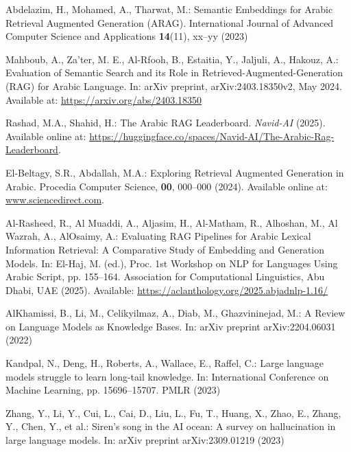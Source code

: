 \documentclass[runningheads]{llncs}
\begin{document}
%
%
%
% 
% 
%
\newpage
\begin{thebibliography}{8}
Abdelazim, H., Mohamed, A., Tharwat, M.: Semantic Embeddings for Arabic Retrieval Augmented Generation (ARAG). International Journal of Advanced Computer Science and Applications \textbf{14}(11), xx--yy (2023)


Mahboub, A., Za’ter, M. E., Al-Rfooh, B., Estaitia, Y., Jaljuli, A., Hakouz, A.:  
Evaluation of Semantic Search and its Role in Retrieved-Augmented-Generation (RAG) for Arabic Language.  
In: arXiv preprint, arXiv:2403.18350v2, May 2024. Available at: \url{https://arxiv.org/abs/2403.18350}

Rashad, M.A., Shahid, H.: The Arabic RAG Leaderboard. \textit{Navid-AI} (2025). Available online at: \url{https://huggingface.co/spaces/Navid-AI/The-Arabic-Rag-Leaderboard}.


El-Beltagy, S.R., Abdallah, M.A.: Exploring Retrieval Augmented Generation in Arabic. Procedia Computer Science, \textbf{00}, 000--000 (2024). Available online at: \url{www.sciencedirect.com}.

Al-Rasheed, R., Al Muaddi, A., Aljasim, H., Al-Matham, R., Alhoshan, M., Al Wazrah, A., AlOsaimy, A.:  
Evaluating RAG Pipelines for Arabic Lexical Information Retrieval: A Comparative Study of Embedding and Generation Models.  
In: El-Haj, M. (ed.), Proc. 1st Workshop on NLP for Languages Using Arabic Script, pp. 155--164.  
Association for Computational Linguistics, Abu Dhabi, UAE (2025).  
Available: \url{https://aclanthology.org/2025.abjadnlp-1.16/}  


AlKhamissi, B., Li, M., Celikyilmaz, A., Diab, M., Ghazvininejad, M.: A Review on Language Models as Knowledge Bases. In: arXiv preprint arXiv:2204.06031 (2022)


Kandpal, N., Deng, H., Roberts, A., Wallace, E., Raffel, C.: Large language models struggle to learn long-tail knowledge. In: International Conference on Machine Learning, pp. 15696--15707. PMLR (2023)

Zhang, Y., Li, Y., Cui, L., Cai, D., Liu, L., Fu, T., Huang, X., Zhao, E., Zhang, Y., Chen, Y., et al.: Siren’s song in the AI ocean: A survey on hallucination in large language models. In: arXiv preprint arXiv:2309.01219 (2023)



\end{thebibliography}
\end{document}
